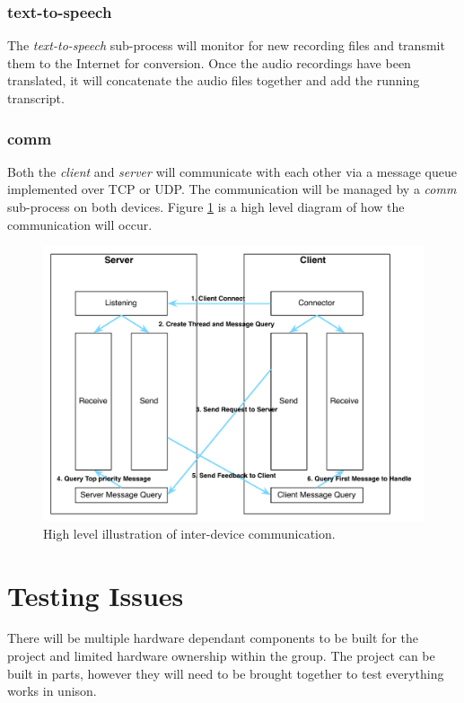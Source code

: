 \documentclass[11pt,a4paper,titlepage]{report}
\begin{document}
\subsubsection{text-to-speech}

The \textit{text-to-speech} sub-process will monitor for new recording files and transmit them to the Internet for conversion. Once the audio recordings have been translated, it will concatenate the audio files together and add the running transcript.


\subsubsection{comm}

Both the \textit{client} and \textit{server} will communicate with each other via a message queue implemented over TCP or UDP. The communication will be managed by a \textit{comm} sub-process on both devices. Figure \ref{fig:comm} is a high level diagram of how the communication will occur.

\begin{figure}
\centering
\includegraphics[width=1.0\textwidth]{graphs/comm.pdf}
\caption{High level illustration of inter-device communication.}
\label{fig:comm}
\end{figure}


\section{Testing Issues}

There will be multiple hardware dependant components to be built for the project and limited hardware ownership within the group. The project can be built in parts, however they will need to be brought together to test everything works in unison.
\end{document}

